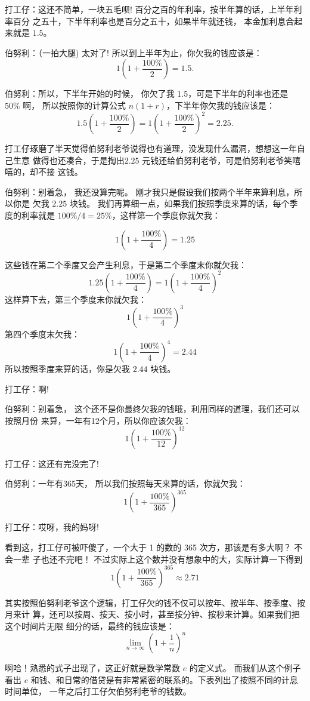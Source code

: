 打工仔：这还不简单，一块五毛呗!  百分之百的年利率，按半年算的话，上半年利率百分
之五十，下半年利率也是百分之五十，如果半年就还钱， 本金加利息合起来就是 $1.5$。

伯努利：（一拍大腿) 太对了!  所以到上半年为止，你欠我的钱应该是：
$$ 1 (1+ \frac {100\%} {2})=1.5 . $$

伯努利：所以，下半年开始的时候， 你欠了我 $1.5$，可是下半年的利率也还是 $50\%$ 啊， 
所以按照你的计算公式 $n(1+r)$，下半年你欠我的钱应该是：
$$ 1.5(1+ \frac {100\%} {2} ) = 1(1+ \frac {100\%} {2})^2 = 2.25 .$$

打工仔琢磨了半天觉得伯努利老爷说得也有道理，没发现什么漏洞，想想这一年自己生意
做得也还凑合，于是掏出$2.25$ 元钱还给伯努利老爷，可是伯努利老爷笑嘻嘻的，却不接
这钱。 

伯努利：别着急， 我还没算完呢。 刚才我只是假设我们按两个半年来算利息，所以你是
欠我 $2.25$ 块钱。 我们再算细一点，如果我们按照季度来算的话，每个季度的利率就是
$ 100\% / 4 = 25\% $，这样第一个季度你就欠我：

$$ 1(1+ \frac {100\%} {4}) = 1.25 $$

这些钱在第二个季度又会产生利息，于是第二个季度末你就欠我：
$$ 1.25(1+ \frac {100\%} {4}) = 1(1+ \frac {100\%} {4})^2 $$
这样算下去，第三个季度末你就欠我：
$$ 1(1+ \frac {100\%} {4})^3 $$
第四个季度末欠我：
$$ 1(1+ \frac {100\%} {4})^4 = 2.44 $$
所以按照季度来算的话，你是欠我 $2.44$ 块钱。 

打工仔：啊!

伯努利：别着急， 这个还不是你最终欠我的钱哦，利用同样的道理，我们还可以按照月份
来算，一年有12个月，所以你应该欠我：
$$ 1(1+ \frac {100\%} {12})^{12} $$

打工仔：这还有完没完了!

伯努利：一年有365天， 所以我们按照每天来算的话，你就欠我：
$$ 1(1+ \frac {100\%} {365})^{365} $$

打工仔：哎呀，我的妈呀!

看到这，打工仔可被吓傻了，一个大于 1 的数的 365 次方，那该是有多大啊？ 不会一辈
子也还不完吧！ 不过实际上这个数并没有想象中的大，实际计算一下得到
$$ 1(1+ \frac {100\%} {365})^{365} \approx 2.71$$

其实按照伯努利老爷这个逻辑，打工仔欠的钱不仅可以按年、按半年、按季度、按月来计
算，还可以按周、按天、按小时，甚至按分钟、按秒来计算。如果我们把这个时间片无限
细分的话，最终的钱应该是：
$$ \lim_{n \to \infty}(1+\frac{1}{n})^n$$

啊哈！熟悉的式子出现了，这正好就是数学常数 $e$ 的定义式。 而我们从这个例子看出
$e$ 和钱、和日常的借贷是有非常紧密的联系的。下表列出了按照不同的计息时间单位，
一年之后打工仔欠伯努利老爷的钱数。

